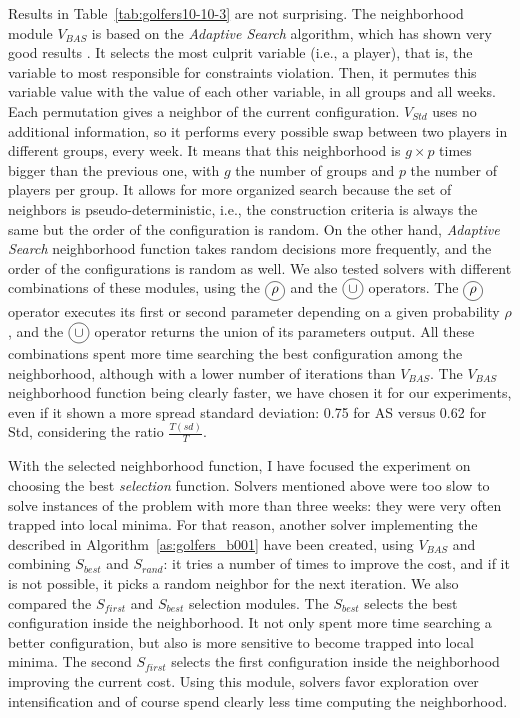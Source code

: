 Results in Table~\ref{tab:golfers10-10-3} are not surprising. The neighborhood module $V_{BAS}$ is based on the {\it Adaptive Search} algorithm, which has shown very good results \cite{Diaz}. %
It selects the most culprit variable (i.e., a player), that is, the variable to most responsible for constraints violation. Then, it permutes this variable value with the value of each other variable, in all groups and all weeks. Each permutation gives a neighbor of the current configuration. $V_{Std}$ uses no additional information, so it performs every possible swap between two players in different groups, every week. It means that this neighborhood is $g\times p$ times bigger than the previous one, with $g$ the number of groups and $p$ the number of players per group. 
It allows for more organized search because the set of neighbors is pseudo-deterministic, i.e., the construction criteria is always the same but the order of the configuration is random. On the other hand, {\it Adaptive Search} neighborhood function takes random decisions more frequently, and the order of the configurations is random as well. We also tested solvers with different combinations of these modules, using the $\circled{$\rho$}$ and the $\circled{$\cup$}$ operators. The $\circled{$\rho$}$ operator executes its first or second parameter depending on a given probability $\rho$, and the $\circled{$\cup$}$ operator returns the union of its parameters output. All these combinations spent more time searching the best configuration among the neighborhood, although with a lower number of iterations than $V_{BAS}$. The $V_{BAS}$ neighborhood function being clearly faster, we have chosen it for our experiments, even if it shown a more spread standard deviation: 0.75 for AS versus 0.62 for Std, considering the ratio $\tfrac{T(sd)}{T}$.

\separation

With the selected neighborhood function, I have focused the experiment on choosing the best {\it selection} function. Solvers mentioned above were too slow to solve instances of the problem with more than three weeks: they were very often trapped into local minima. For that reason, another solver implementing the \as{} described in Algorithm~\ref{as:golfers_b001} have been created, using $V_{BAS}$ and combining $S_{best}$ and $S_{rand}$: it tries a number of times to improve the cost, and if it is not possible, it picks a random neighbor for the next iteration. We also compared the $S_{first}$ and $S_{best}$ selection modules. The \om{} $S_{best}$ selects the best configuration inside the neighborhood. It not only spent more time searching a better configuration, but also is more sensitive to become trapped into local minima. The second \om{} $S_{first}$ selects the first configuration inside the neighborhood improving the current cost. Using this module, solvers favor exploration over intensification and of course spend clearly less time computing the neighborhood. 

